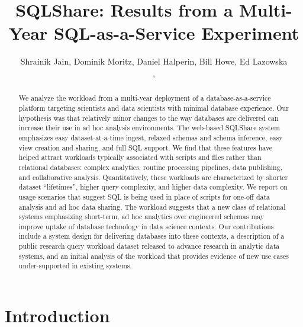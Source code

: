 \documentclass{sig-alternate}
\newcommand{\note}[2]{{\color{#1} {#2}}}
\newcommand{\reviewmeta}[1]{\note{black}{#1}}
\newcommand{\sqlshare}{SQLShare}
\newcommand{\TITLE}{\sqlshare: Results from a Multi-Year SQL-as-a-Service Experiment}
\begin{document}
\title{\TITLE}


\author{
\alignauthor
 Shrainik Jain, Dominik Moritz, Daniel Halperin, Bill Howe, Ed Lazowska\\
       ,
       \\
}

\maketitle

\begin{abstract}
We analyze the workload from a multi-year deployment of a database-as-a-service platform targeting scientists and data scientists with minimal database experience.  Our hypothesis was that relatively minor changes to the way databases are delivered can increase their use in ad hoc analysis environments.  The web-based \sqlshare{} system emphasizes easy dataset-at-a-time ingest, relaxed schemas and schema inference, easy view creation and sharing, and full SQL support. We find that these features have helped attract workloads typically associated with scripts and files rather than relational databases: complex analytics, routine processing pipelines, data publishing, and collaborative analysis. Quantitatively, these workloads are characterized by shorter dataset ``lifetimes'', higher query complexity, and higher data complexity. \reviewmeta{We report on usage scenarios that suggest SQL is being used in place of scripts for one-off data analysis and ad hoc data sharing.
The workload suggests that a new class of relational systems emphasizing short-term, ad hoc analytics over engineered schemas may improve uptake of database technology in data science contexts.}
Our contributions include a system design for delivering databases into these contexts, a description of a public research query workload dataset released to advance research in analytic data systems, and an initial analysis of the workload that provides evidence of new use cases under-supported in existing systems.
\end{abstract}

\section{Introduction}
\label{sec:introduction}
\end{document}
